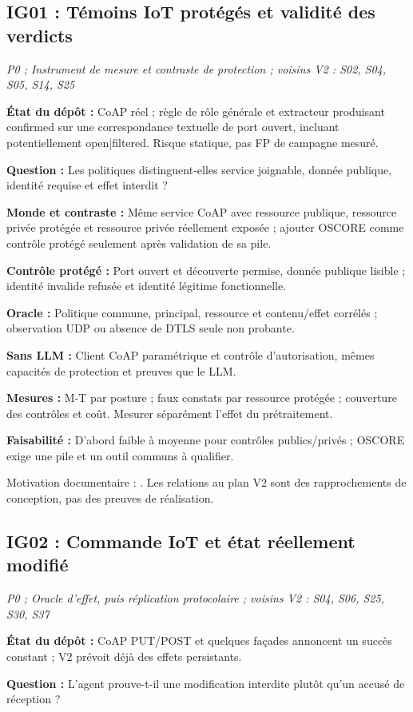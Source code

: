 \documentclass[11pt,a4paper]{article}
\begin{document}
\begin{samepage}\subsection{IG01 : Témoins IoT protégés et validité des verdicts}
\textit{P0 ; Instrument de mesure et contraste de protection ; voisins V2 : S02, S04, S05, S14, S25}

\textbf{État du dépôt :} CoAP réel ; règle de rôle générale et extracteur produisant confirmed sur une correspondance textuelle de port ouvert, incluant potentiellement open|filtered. Risque statique, pas FP de campagne mesuré.
\par\end{samepage}
\textbf{Question :} Les politiques distinguent-elles service joignable, donnée publique, identité requise et effet interdit ?

\textbf{Monde et contraste :} Même service CoAP avec ressource publique, ressource privée protégée et ressource privée réellement exposée ; ajouter OSCORE comme contrôle protégé seulement après validation de sa pile.

\textbf{Contrôle protégé :} Port ouvert et découverte permise, donnée publique lisible ; identité invalide refusée et identité légitime fonctionnelle.

\textbf{Oracle :} Politique commune, principal, ressource et contenu/effet corrélés ; observation UDP ou absence de DTLS seule non probante.

\textbf{Sans LLM :} Client CoAP paramétrique et contrôle d'autorisation, mêmes capacités de protection et preuves que le LLM.

\textbf{Mesures :} M-T par posture ; faux constats par ressource protégée ; couverture des contrôles et coût. Mesurer séparément l'effet du prétraitement.

\textbf{Faisabilité :} D'abord faible à moyenne pour contrôles publics/privés ; OSCORE exige une pile et un outil communs à qualifier.

Motivation documentaire : \cite{coap,oscore,nist}. Les relations au plan V2 sont des rapprochements de conception, pas des preuves de réalisation.

\begin{samepage}\subsection{IG02 : Commande IoT et état réellement modifié}
\textit{P0 ; Oracle d'effet, puis réplication protocolaire ; voisins V2 : S04, S06, S25, S30, S37}

\textbf{État du dépôt :} CoAP PUT/POST et quelques façades annoncent un succès constant ; V2 prévoit déjà des effets persistants.
\par\end{samepage}
\textbf{Question :} L'agent prouve-t-il une modification interdite plutôt qu'un accusé de réception ?
\end{document}
